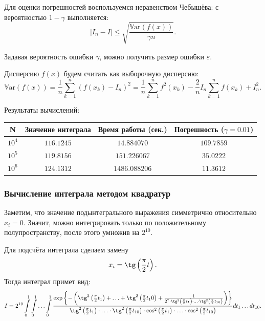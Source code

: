 \documentclass[11pt]{article}
\newcommand\abs[1]{\left\lvert#1\right\rvert}
\begin{document}


Для оценки погрешностей воспользуемся неравенством Чебышёва: с вероятностью $1 - \gamma$ выполняется:
$$
\abs{I_n - I} \leqslant \sqrt{\frac{\mathbb{V}\mathrm{ar}(f(x))}{\gamma n}}.
$$

Задавая вероятность ошибки $\gamma$, можно получить размер ошибки $\varepsilon$.

Дисперсию $f(x)$ будем считать как выборочную дисперсию:
$$
\mathbb{V}\mathrm{ar}(f(x)) = \frac{1}{n} \sum\limits_{k=1}^n \left( f(x_k) - I_n \right)^2 = \frac{1}{n} \sum\limits_{k=1}^n f^2(x_k) - \frac{2}{n} I_n \sum\limits_{k=1}^n f(x_k) + I_n^2.
$$

Результаты вычислений:

\begin{tabular}{|c|c|c|c|}
\hline
N & Значение интеграла & Время работы (сек.) & Погрешность ($\gamma = 0.01$)\\
\hline
$10^4$ & $116.1245$ & $14.884070$ & $109.7859$ \\
\hline
$10^5$ & $119.8156$ & $151.226067$ & $35.0222$ \\
\hline
$10^6$ & $124.1312$ & $1486.088206$ & $11.3612$ \\
\hline
\end{tabular}
\subsubsection{Вычисление интеграла методом квадратур}
Заметим, что значение подынтегрального выражения симметрично относительно $x_i = 0$. Значит, можно интегрировать только по положительному полупространству, после этого умножив на $2^{10}$.

Для подсчёта интеграла сделаем замену
$$
x_i = \tg \left( \frac{\pi}{2} t \right).
$$
Тогда интеграл примет вид:
$$
I = 2^{10} \int\limits_0^1 \int\limits_0^1 \ldots \int\limits_0^1 \frac{\exp\left\{ -\left( \tg^2 \left( \frac{\pi}{2} t_1 \right) + \ldots + \tg^2 \left( \frac{\pi}{2} t_10 \right) + \frac{1}{2^7 \cdot \tg^2 \left( \frac{\pi}{2} t_1 \right) \cdot \ldots \cdot \tg^2 \left( \frac{\pi}{2} t_{10} \right) } \right) \right\} }{\tg^2 \left( \frac{\pi}{2} t_1 \right) \cdot \ldots \cdot \tg^2 \left( \frac{\pi}{2} t_{10} \right) \cdot \cos^2 \left( \frac{\pi}{2} t_1 \right) \cdot \ldots \cdot \cos^2 \left( \frac{\pi}{2} t_{10} \right)} dt_1 \ldots dt_{10}.
$$
\end{document}
